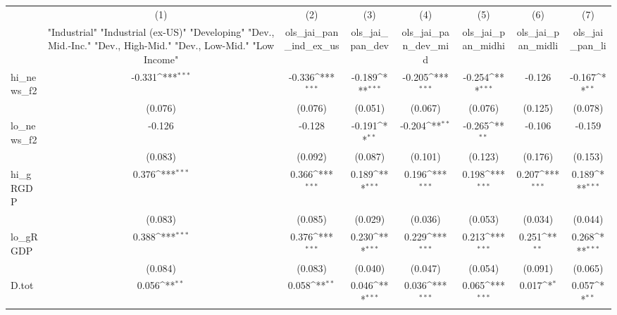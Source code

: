{
\def\sym#1{\ifmmode^{#1}\else\(^{#1}\)\fi}
\begin{tabular}{l*{7}{c}}
\toprule
            &\multicolumn{1}{c}{(1)}&\multicolumn{1}{c}{(2)}&\multicolumn{1}{c}{(3)}&\multicolumn{1}{c}{(4)}&\multicolumn{1}{c}{(5)}&\multicolumn{1}{c}{(6)}&\multicolumn{1}{c}{(7)}\\
            &\multicolumn{1}{c}{ "Industrial" "Industrial (ex-US)" "Developing" "Dev., Mid.-Inc." "Dev., High-Mid."  "Dev., Low-Mid." "Low Income" }&\multicolumn{1}{c}{ols\_jai\_pan\_ind\_ex\_us}&\multicolumn{1}{c}{ols\_jai\_pan\_dev}&\multicolumn{1}{c}{ols\_jai\_pan\_dev\_mid}&\multicolumn{1}{c}{ols\_jai\_pan\_midhi}&\multicolumn{1}{c}{ols\_jai\_pan\_midli}&\multicolumn{1}{c}{ols\_jai\_pan\_li}\\
\midrule
hi\_news\_f2  &      -0.331\sym{***}&      -0.336\sym{***}&      -0.189\sym{***}&      -0.205\sym{***}&      -0.254\sym{***}&      -0.126         &      -0.167\sym{**} \\
            &     (0.076)         &     (0.076)         &     (0.051)         &     (0.067)         &     (0.076)         &     (0.125)         &     (0.078)         \\
\addlinespace
lo\_news\_f2  &      -0.126         &      -0.128         &      -0.191\sym{**} &      -0.204\sym{**} &      -0.265\sym{**} &      -0.106         &      -0.159         \\
            &     (0.083)         &     (0.092)         &     (0.087)         &     (0.101)         &     (0.123)         &     (0.176)         &     (0.153)         \\
\addlinespace
hi\_gRGDP    &       0.376\sym{***}&       0.366\sym{***}&       0.189\sym{***}&       0.196\sym{***}&       0.198\sym{***}&       0.207\sym{***}&       0.189\sym{***}\\
            &     (0.083)         &     (0.085)         &     (0.029)         &     (0.036)         &     (0.053)         &     (0.034)         &     (0.044)         \\
\addlinespace
lo\_gRGDP    &       0.388\sym{***}&       0.376\sym{***}&       0.230\sym{***}&       0.229\sym{***}&       0.213\sym{***}&       0.251\sym{**} &       0.268\sym{***}\\
            &     (0.084)         &     (0.083)         &     (0.040)         &     (0.047)         &     (0.054)         &     (0.091)         &     (0.065)         \\
\addlinespace
D.tot       &       0.056\sym{**} &       0.058\sym{**} &       0.046\sym{***}&       0.036\sym{***}&       0.065\sym{***}&       0.017\sym{*}  &       0.057\sym{**} \\

\end{tabular}}
